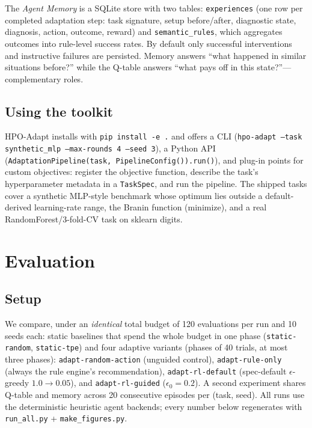 \documentclass[10pt]{article}
\newcommand{\toolname}{HPO-Adapt}
\begin{document}
The \emph{Agent Memory} is a SQLite store with two tables:
\texttt{experiences} (one row per completed adaptation step: task
signature, setup before/after, diagnostic state, diagnosis, action,
outcome, reward) and \texttt{semantic\_rules}, which aggregates outcomes
into rule-level success rates. By default only successful interventions and
instructive failures are persisted. Memory answers ``what happened in
similar situations before?'' while the Q-table answers ``what pays off in
this state?''---complementary roles.

\subsection{Using the toolkit}

\toolname{} installs with \texttt{pip install -e .} and offers a CLI
(\texttt{hpo-adapt --task synthetic\_mlp --max-rounds 4 --seed 3}), a
Python API (\texttt{AdaptationPipeline(task, PipelineConfig()).run()}), and
plug-in points for custom objectives: register the objective function,
describe the task's hyperparameter metadata in a \texttt{TaskSpec}, and run
the pipeline. The shipped tasks cover a synthetic MLP-style benchmark
whose optimum lies outside a default-derived learning-rate range, the
Branin function (minimize), and a real RandomForest/3-fold-CV task on
sklearn digits.

\section{Evaluation}
\label{sec:eval}

\subsection{Setup}

We compare, under an \emph{identical} total budget of 120 evaluations per
run and 10 seeds each: static baselines that spend the whole budget in one
phase (\texttt{static-random}, \texttt{static-tpe}) and four adaptive
variants (phases of 40 trials, at most three phases):
\texttt{adapt-random-action} (unguided control), \texttt{adapt-rule-only}
(always the rule engine's recommendation), \texttt{adapt-rl-default}
(spec-default $\epsilon$-greedy $1.0\!\to\!0.05$), and
\texttt{adapt-rl-guided} ($\epsilon_0=0.2$). A second experiment shares
Q-table and memory across 20 consecutive episodes per (task, seed). All
runs use the deterministic heuristic agent backends; every number below
regenerates with \texttt{run\_all.py} + \texttt{make\_figures.py}.
\end{document}
